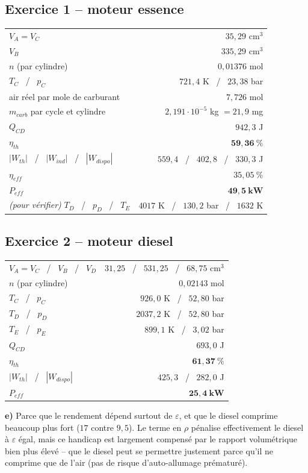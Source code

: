 \documentclass[11pt,a4paper]{article}
\begin{document}
\subsection*{Exercice 1 -- moteur essence}
\begin{center}
\begin{tabularx}{0.9\linewidth}{@{}X r@{}}
\toprule
$V_A=V_C$ & $35{,}29$ cm$^3$ \\
$V_B$ & $335{,}29$ cm$^3$ \\
$n$ (par cylindre) & $0{,}01376$ mol \\
$T_C$ \ / \ $p_C$ & $721{,}4$ K \ / \ $23{,}38$ bar \\
air réel par mole de carburant & $7{,}726$ mol \\
$m_{carb}$ par cycle et cylindre & $2{,}191\cdot10^{-5}$ kg $=21{,}9$ mg \\
$Q_{CD}$ & $942{,}3$ J \\
$\eta_{th}$ & $\mathbf{59{,}36\ \%}$ \\
$|W_{th}|$ \ / \ $|W_{ind}|$ \ / \ $|W_{dispo}|$ & $559{,}4$ \ / \ $402{,}8$ \ / \ $330{,}3$ J \\
$\eta_{eff}$ & $35{,}05\ \%$ \\
$P_{eff}$ & $\mathbf{49{,}5\ kW}$ \\
\midrule
\emph{(pour vérifier)} $T_D$ \ / \ $p_D$ \ / \ $T_E$ & $4017$ K \ / \ $130{,}2$ bar \ / \ $1632$ K \\
\bottomrule
\end{tabularx}
\end{center}

\subsection*{Exercice 2 -- moteur diesel}
\begin{center}
\begin{tabularx}{0.9\linewidth}{@{}X r@{}}
\toprule
$V_A=V_C$ \ / \ $V_B$ \ / \ $V_D$ & $31{,}25$ \ / \ $531{,}25$ \ / \ $68{,}75$ cm$^3$ \\
$n$ (par cylindre) & $0{,}02143$ mol \\
$T_C$ \ / \ $p_C$ & $926{,}0$ K \ / \ $52{,}80$ bar \\
$T_D$ \ / \ $p_D$ & $2037{,}2$ K \ / \ $52{,}80$ bar \\
$T_E$ \ / \ $p_E$ & $899{,}1$ K \ / \ $3{,}02$ bar \\
$Q_{CD}$ & $693{,}0$ J \\
$\eta_{th}$ & $\mathbf{61{,}37\ \%}$ \\
$|W_{th}|$ \ / \ $|W_{dispo}|$ & $425{,}3$ \ / \ $282{,}0$ J \\
$P_{eff}$ & $\mathbf{25{,}4\ kW}$ \\
\bottomrule
\end{tabularx}
\end{center}
\textbf{e)} Parce que le rendement dépend surtout de $\varepsilon$, et que le diesel comprime beaucoup
plus fort ($17$ contre $9{,}5$). Le terme en $\rho$ pénalise effectivement le diesel à $\varepsilon$ égal,
mais ce handicap est largement compensé par le rapport volumétrique bien plus élevé -- que le diesel peut
se permettre justement parce qu'il ne comprime que de l'air (pas de risque d'auto-allumage prématuré).
\end{document}
